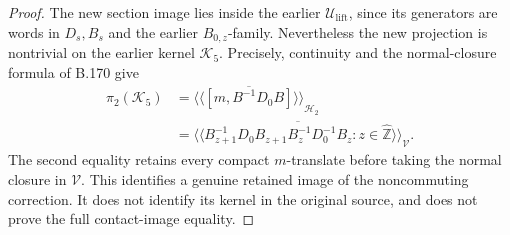 \begin{proof}
The new section image lies inside the earlier
\(\mathcal U_{\mathrm{lift}}\), since its generators are words in
\(D_s,B_s\) and the earlier \(B_{0,z}\)-family. Nevertheless the
new projection is nontrivial on the earlier kernel \(\mathcal K_5\).
Precisely, continuity and the normal-closure formula of B.170 give
\begin{equation}\label{eq:B173-retained-defect-image}
 \begin{split}
 \pi_2(\mathcal K_5)
   &=\overline{\langle\!\langle[m,B^{-1}D_0B]
                             \rangle\!\rangle}_{\mathcal H_2}\\
   &=\overline{\langle\!\langle
        B_{z+1}^{-1}D_0B_{z+1}B_z^{-1}D_0^{-1}B_z:
                     z\in\widehat{\mathbb Z}
                             \rangle\!\rangle}_{\mathcal V}.
 \end{split}
\end{equation}
The second equality retains every compact \(m\)-translate before
taking the normal closure in \(\mathcal V\).
This identifies a genuine retained image of the noncommuting
correction. It does not identify its kernel in the original source,
and does not prove the full contact-image equality.
\end{proof}
